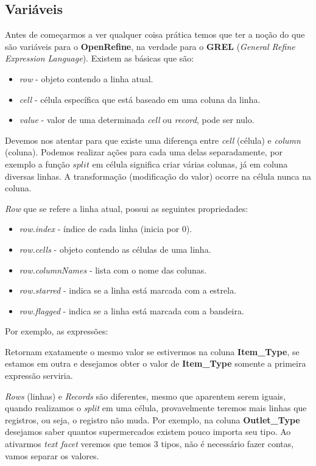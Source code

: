 \documentclass[a4paper,11pt]{article}
\begin{document}
\subsection{Variáveis}
Antes de começarmos a ver qualquer coisa prática temos que ter a noção do que são variáveis para o \textbf{OpenRefine}, na verdade para o \textbf{GREL} (\textit{General Refine Expression Language}). Existem as básicas que são:
\begin{itemize}[nolistsep]
	\item \textit{row} - objeto contendo a linha atual.
	\item \textit{cell} - célula específica que está baseado em uma coluna da linha.
	\item \textit{value} - valor de uma determinada \textit{cell} ou \textit{record}, pode ser nulo.
\end{itemize}

Devemos nos atentar para que existe uma diferença entre \textit{cell} (célula) e \textit{column} (coluna). Podemos realizar ações para cada uma delas separadamente, por exemplo a função $split$ em célula significa criar várias colunas, já em coluna diversas linhas. A transformação (modificação do valor) ocorre na célula nunca na coluna.

\textit{Row} que se refere a linha atual, possui as seguintes propriedades:
\begin{itemize}[nolistsep]
	\item \textit{row.index} - índice de cada linha (inicia por 0).
	\item \textit{row.cells} - objeto contendo as células de uma linha.
	\item \textit{row.columnNames} - lista com o nome das colunas.
	\item \textit{row.starred} - indica se a linha está marcada com a estrela.
	\item \textit{row.flagged} - indica se a linha está marcada com a bandeira.
\end{itemize}

Por exemplo, as expressões: \\

Retornam exatamente o mesmo valor se estivermos na coluna \textbf{Item\_Type}, se estamos em outra e desejamos obter o valor de \textbf{Item\_Type} somente a primeira expressão serviria.

\textit{Rows} (linhas) e \textit{Records} são diferentes, mesmo que aparentem serem iguais, quando realizamos o \textit{split} em uma célula, provavelmente teremos mais linhas que registros, ou seja, o registro não muda. Por exemplo, na coluna \textbf{Outlet\_Type} desejamos saber quantos supermercados existem pouco importa seu tipo. Ao ativarmos \textit{text facet} veremos que temos 3 tipos, não é necessário fazer contas, vamos separar os valores. 
\end{document}
